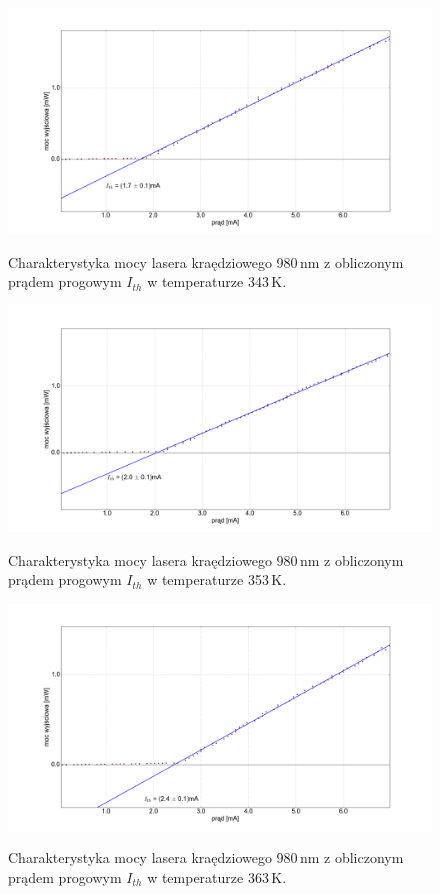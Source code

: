 \documentclass[a4paper, portrait,12pt]{report}
\begin{document}
\begin{figure}
\center
  \includegraphics[scale=0.30]{plot980/temp_70_fit.png}
  \label{rys1}
  \caption{Charakterystyka mocy lasera kraędziowego 980\,nm z obliczonym prądem progowym $I_{th}$ w temperaturze 343\,K.} 
\end{figure}

\begin{figure}
\center
  \includegraphics[scale=0.30]{plot980/temp_80_fit.png}
  \label{rys1}
  \caption{Charakterystyka mocy lasera kraędziowego 980\,nm z obliczonym prądem progowym $I_{th}$  w temperaturze 353\,K.} 
\end{figure}

\begin{figure}
\center
  \includegraphics[scale=0.30]{plot980/temp_90_fit.png}
  \label{rys1}
  \caption{Charakterystyka mocy lasera kraędziowego 980\,nm z obliczonym prądem progowym $I_{th}$  w temperaturze 363\,K.} 
\end{figure}
\end{document}
